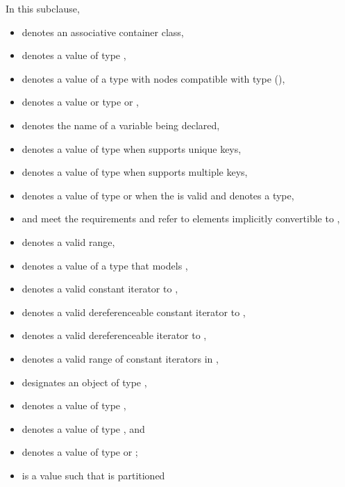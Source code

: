 \pnum
In this subclause,
\begin{itemize}
\item
{} denotes an associative container class,
\item
{} denotes a value of type ,
\item
{} denotes a value of a type with nodes compatible with type
 (),
\item
{} denotes a value or type  or ,
\item
{} denotes the name of a variable being declared,
\item
{} denotes a value of type 
when  supports unique keys,
\item
{} denotes a value of type 
when  supports multiple keys,
\item
{} denotes a value of type  or 
when the 
 is valid
and denotes a type,
\item
{} and 
meet the  requirements and refer to elements
implicitly convertible to
,
\item
{} denotes a valid range,
\item
{} denotes a value of a type 
that models ,
\item
{} denotes a valid constant iterator to ,
\item
{} denotes a valid dereferenceable constant iterator to ,
\item
{} denotes a valid dereferenceable iterator to ,
\item
\tcode{[q1, q2)} denotes a valid range of constant iterators in ,
\item
{} designates an object of type ,
\item
{} denotes a value of type ,
\item
{} denotes a value of type , and
\item
{} denotes a value of type  or ;
\item
{} is a value such that  is partitioned

\end{itemize}
